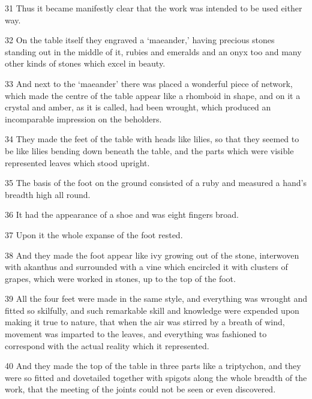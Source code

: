 \par 31 Thus it became manifestly clear that the work was intended to be used either way.

\par 32 On the table itself they engraved a ‘maeander,’ having precious stones standing out in the middle of it, rubies and emeralds and an onyx too and many other kinds of stones which excel in beauty.

\par 33 And next to the ‘maeander’ there was placed a wonderful piece of network, which made the centre of the table appear like a rhomboid in shape, and on it a crystal and amber, as it is called, had been wrought, which produced an incomparable impression on the beholders.

\par 34 They made the feet of the table with heads like lilies, so that they seemed to be like lilies bending down beneath the table, and the parts which were visible represented leaves which stood upright.

\par 35 The basis of the foot on the ground consisted of a ruby and measured a hand's breadth high all round.

\par 36 It had the appearance of a shoe and was eight fingers broad.

\par 37 Upon it the whole expanse of the foot rested.

\par 38 And they made the foot appear like ivy growing out of the stone, interwoven with akanthus and surrounded with a vine which encircled it with clusters of grapes, which were worked in stones, up to the top of the foot.

\par 39 All the four feet were made in the same style, and everything was wrought and fitted so skilfully, and such remarkable skill and knowledge were expended upon making it true to nature, that when the air was stirred by a breath of wind, movement was imparted to the leaves, and everything was fashioned to correspond with the actual reality which it represented.

\par 40 And they made the top of the table in three parts like a triptychon, and they were so fitted and dovetailed together with spigots along the whole breadth of the work, that the meeting of the joints could not be seen or even discovered.

